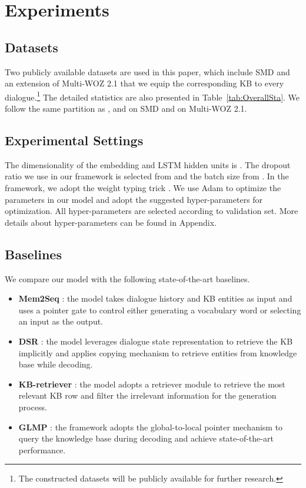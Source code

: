 \documentclass[11pt,a4paper]{article}
\begin{document}
\section{Experiments}
\subsection{Datasets}
Two publicly available datasets are used in this paper, which include SMD \cite{eric-etal-2017-key}
and an extension of Multi-WOZ 2.1 \cite{budzianowski-etal-2018-multiwoz} that we equip the corresponding KB to every dialogue.\footnote{The constructed datasets will be publicly available for further research.}
The detailed statistics are also presented in  Table~\ref{tab:OverallSta}.
 We follow the same partition as ,  and  on SMD and \cite{budzianowski-etal-2018-multiwoz} on Multi-WOZ 2.1.
 

\subsection{Experimental Settings}
The dimensionality of the embedding and LSTM hidden units is . The dropout ratio we use in our framework is selected from  and the batch size from  . In the framework, we adopt the weight typing trick \cite{DBLP:conf/iclr/WuSX19}.
We use Adam \cite{DBLP:journals/corr/KingmaB14} to optimize the parameters in our model and adopt the suggested hyper-parameters for optimization.
All hyper-parameters are selected according to validation set.
More details about hyper-parameters can be found in Appendix.

\subsection{Baselines}
We compare our model with the following state-of-the-art baselines.
\begin{itemize}
	\item  \textbf{Mem2Seq} \cite{madotto-etal-2018-mem2seq}:
	the model takes dialogue history and KB entities
	as input and uses a pointer gate
	to control either generating a vocabulary word or selecting 
	an input as the output.
	\item \textbf{DSR} \cite{wen-etal-2018-sequence}: the model leverages dialogue state representation to retrieve the KB implicitly and  applies copying mechanism to retrieve entities from knowledge base while decoding.
	\item  \textbf{KB-retriever} \cite{qin-etal-2019-entity}: the model adopts a retriever module to retrieve the most relevant KB row and filter the irrelevant information for the generation process.
	\item  \textbf{GLMP} \cite{DBLP:conf/iclr/WuSX19}:  the framework adopts the global-to-local pointer mechanism to query the knowledge base during decoding and achieve state-of-the-art performance.
\end{itemize}
\end{document}
